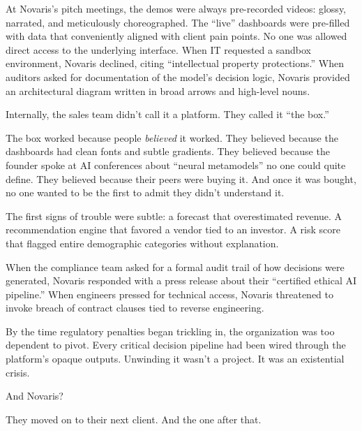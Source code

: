 At Novaris’s pitch meetings, the demos were always pre-recorded videos: glossy, narrated, and meticulously choreographed. The “live” dashboards were pre-filled with data that conveniently aligned with client pain points. No one was allowed direct access to the underlying interface. When IT requested a sandbox environment, Novaris declined, citing “intellectual property protections.” When auditors asked for documentation of the model’s decision logic, Novaris provided an architectural diagram written in broad arrows and high-level nouns.

Internally, the sales team didn’t call it a platform. They called it “the box.”

The box worked because people \textit{believed} it worked. They believed because the dashboards had clean fonts and subtle gradients. They believed because the founder spoke at AI conferences about “neural metamodels” no one could quite define. They believed because their peers were buying it. And once it was bought, no one wanted to be the first to admit they didn’t understand it.


The first signs of trouble were subtle: a forecast that overestimated revenue. A recommendation engine that favored a vendor tied to an investor. A risk score that flagged entire demographic categories without explanation.


When the compliance team asked for a formal audit trail of how decisions were generated, Novaris responded with a press release about their “certified ethical AI pipeline.” When engineers pressed for technical access, Novaris threatened to invoke breach of contract clauses tied to reverse engineering.

By the time regulatory penalties began trickling in, the organization was too dependent to pivot. Every critical decision pipeline had been wired through the platform’s opaque outputs. Unwinding it wasn’t a project. It was an existential crisis.

And Novaris?

They moved on to their next client. And the one after that.


